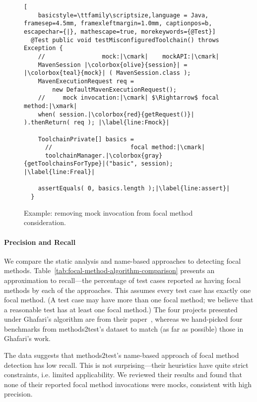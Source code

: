 \begin{figure}[h]
	\begin{lstlisting}[
	basicstyle=\ttfamily\scriptsize,language = Java, framesep=4.5mm, framexleftmargin=1.0mm, captionpos=b, escapechar={|}, mathescape=true, morekeywords={@Test}]
  @Test public void testMisconfiguredToolchain() throws Exception {
    //                mock:|\cmark|    mockAPI:|\cmark|
    MavenSession |\colorbox{olive}{session}| = |\colorbox{teal}{mock}| ( MavenSession.class );
    MavenExecutionRequest req =
        new DefaultMavenExecutionRequest();
    //     mock invocation:|\cmark| $\Rightarrow$ focal method:|\xmark|
    when( session.|\colorbox{red}{getRequest()}| ).thenReturn( req ); |\label{line:Fmock}|

    ToolchainPrivate[] basics =
      //                      focal method:|\cmark|
      toolchainManager.|\colorbox{gray}{getToolchainsForType}|("basic", session); |\label{line:Freal}|

    assertEquals( 0, basics.length );|\label{line:assert}|
  }
  \end{lstlisting}

  \caption{Example: removing mock invocation from focal method consideration.}
  \label{fig:mockExampleEvaluation}
\end{figure}

\paragraph{Precision and Recall}
We compare the static analysis and name-based approaches to detecting focal methods. Table~\ref{tab:focal-method-algorithm-comparison} presents an approximation to recall---the percentage of test cases reported as having focal methods by each of the approaches. This assumes every test case has exactly one focal method. (A test case may have more than one focal method; we believe that a reasonable test has at least one focal method.) The four projects presented under Ghafari's algorithm are from their paper~\cite{ghafari15:_autom}, whereas we hand-picked four benchmarks from methods2test's dataset to match (as far as possible) those in Ghafari's work.

The data suggests that methods2test's name-based approach of focal method detection has low recall. This is not surprising---their heuristics have quite strict constraints, i.e. limited applicability. We reviewed their results and found that none of their reported focal method invocations were mocks, consistent with high precision.

